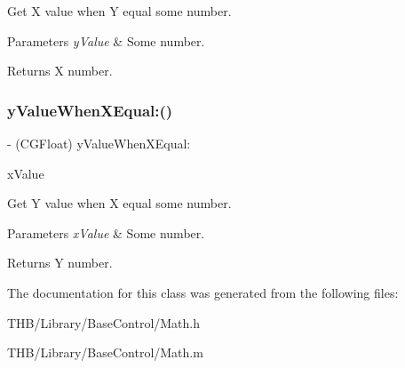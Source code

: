 Get X value when Y equal some number.


\begin{DoxyParams}{Parameters}
{\em y\+Value} & Some number.\\
\hline
\end{DoxyParams}
\begin{DoxyReturn}{Returns}
X number. 
\end{DoxyReturn}
\mbox{\label{interface_math_a30abd3a6eca23c2db7910c7efc91b4b3}} 
\subsubsection{\texorpdfstring{y\+Value\+When\+X\+Equal\+:()}{yValueWhenXEqual:()}}
{\footnotesize\ttfamily -\/ (C\+G\+Float) y\+Value\+When\+X\+Equal\+: \begin{DoxyParamCaption}\item[{(C\+G\+Float)}]{x\+Value }\end{DoxyParamCaption}}

Get Y value when X equal some number.


\begin{DoxyParams}{Parameters}
{\em x\+Value} & Some number.\\
\hline
\end{DoxyParams}
\begin{DoxyReturn}{Returns}
Y number. 
\end{DoxyReturn}


The documentation for this class was generated from the following files\+:\begin{DoxyCompactItemize}
\item 
T\+H\+B/\+Library/\+Base\+Control/Math.\+h\item 
T\+H\+B/\+Library/\+Base\+Control/Math.\+m\end{DoxyCompactItemize}
